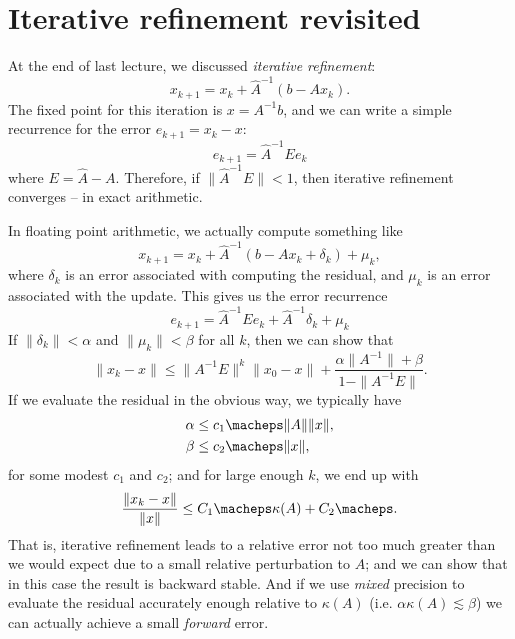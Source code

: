 \section{Iterative refinement revisited}

At the end of last lecture, we discussed {\em iterative refinement}:
\[
  x_{k+1} = x_k + \hat{A}^{-1} (b - A x_{k}).
\]
The fixed point for this iteration is $x = A^{-1} b$, and we can write
a simple recurrence for the error $e_{k+1} = x_k-x$:
\[
  e_{k+1} = \hat{A}^{-1} E e_k
\]
where $E = \hat{A}-A$.  Therefore, if $\|\hat{A}^{-1} E\|<1$, then
iterative refinement converges -- in exact arithmetic.

In floating point arithmetic, we actually compute something like
\[
  x_{k+1} = x_k + \hat{A}^{-1} (b - A x_{k} + \delta_k) + \mu_k,
\]
where $\delta_k$ is an error associated with computing the residual, and
$\mu_k$ is an error associated with the update.  This gives us the
error recurrence
\[
  e_{k+1} = \hat{A}^{-1} E e_k + \hat{A}^{-1} \delta_k + \mu_k
\]
If $\|\delta_k\| < \alpha$ and $\|\mu_k\| < \beta$ for all $k$, then
we can show that
\[
  \|x_k-x\| \leq
    \|A^{-1} E\|^k \|x_0-x\| +
    \frac{ \alpha \|A^{-1}\| + \beta }{1 - \|A^{-1}E\|}.
\]
If we evaluate the residual in the obvious way, we typically have
\begin{align*}
  \alpha & \leq c_1 \macheps \|A\| \|x\|, \\
  \beta & \leq c_2 \macheps \|x\|,
\end{align*}
for some modest $c_1$ and $c_2$; and for large enough $k$, we end up with
\[
  \frac{\|x_k-x\|}{\|x\|} \leq C_1 \macheps \kappa(A) + C_2 \macheps.
\]
That is, iterative refinement leads to a relative error not too much
greater than we would expect due to a small relative perturbation to $A$;
and we can show that in this case the result is backward stable.
And if we use {\em mixed} precision to evaluate the residual accurately
enough relative to $\kappa(A)$ (i.e. $\alpha \kappa(A) \lesssim \beta$)
we can actually achieve a small {\em forward} error.
